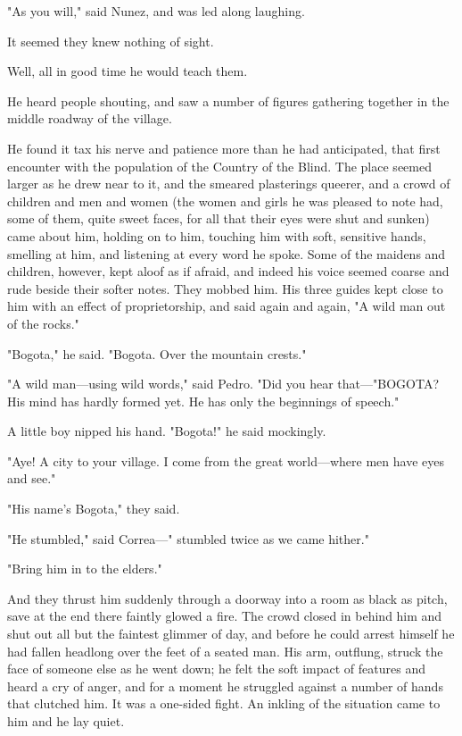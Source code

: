 \documentclass[submission]{sffms}
\begin{document}
"As you will," said Nunez, and was led along laughing.

It seemed they knew nothing of sight.

Well, all in good time he would teach them.

He heard people shouting, and saw a number of figures gathering
together in the middle roadway of the village.

He found it tax his nerve and patience more than he had anticipated,
that first encounter with the population of the Country of the
Blind. The place seemed larger as he drew near to it, and the smeared
plasterings queerer, and a crowd of children and men and women (the
women and girls he was pleased to note had, some of them, quite sweet
faces, for all that their eyes were shut and sunken) came about him,
holding on to him, touching him with soft, sensitive hands, smelling
at him, and listening at every word he spoke. Some of the maidens and
children, however, kept aloof as if afraid, and indeed his voice
seemed coarse and rude beside their softer notes. They mobbed him. His
three guides kept close to him with an effect of proprietorship, and
said again and again, "A wild man out of the rocks."

"Bogota," he said. "Bogota. Over the mountain crests."

"A wild man---using wild words," said Pedro. "Did you hear
that---"BOGOTA? His mind has hardly formed yet. He has only the
beginnings of speech."

A little boy nipped his hand. "Bogota!" he said mockingly.

"Aye! A city to your village. I come from the great world---where men
have eyes and see."

"His name's Bogota," they said.

"He stumbled," said Correa---" stumbled twice as we came hither."

"Bring him in to the elders."

And they thrust him suddenly through a doorway into a room as black as
pitch, save at the end there faintly glowed a fire. The crowd closed
in behind him and shut out all but the faintest glimmer of day, and
before he could arrest himself he had fallen headlong over the feet of
a seated man. His arm, outflung, struck the face of someone else as he
went down; he felt the soft impact of features and heard a cry of
anger, and for a moment he struggled against a number of hands that
clutched him. It was a one-sided fight. An inkling of the situation
came to him and he lay quiet.
\end{document}
